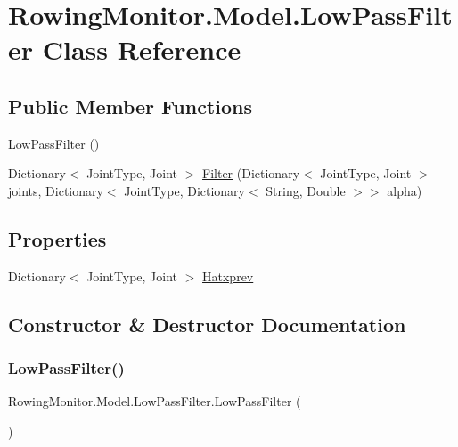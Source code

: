 \hypertarget{class_rowing_monitor_1_1_model_1_1_low_pass_filter}{}\section{Rowing\+Monitor.\+Model.\+Low\+Pass\+Filter Class Reference}
\label{class_rowing_monitor_1_1_model_1_1_low_pass_filter}
\subsection*{Public Member Functions}
\begin{DoxyCompactItemize}
\item 
\hyperlink{class_rowing_monitor_1_1_model_1_1_low_pass_filter_ae2409a1bea75885b3de02c300f46bb68}{Low\+Pass\+Filter} ()
\item 
Dictionary$<$ Joint\+Type, Joint $>$ \hyperlink{class_rowing_monitor_1_1_model_1_1_low_pass_filter_abd95054e31280d78ad6d0d4a5bd106ea}{Filter} (Dictionary$<$ Joint\+Type, Joint $>$ joints, Dictionary$<$ Joint\+Type, Dictionary$<$ String, Double $>$$>$ alpha)
\end{DoxyCompactItemize}
\subsection*{Properties}
\begin{DoxyCompactItemize}
\item 
Dictionary$<$ Joint\+Type, Joint $>$ \hyperlink{class_rowing_monitor_1_1_model_1_1_low_pass_filter_ab5c930d79699ed13c290b56a9d4501c6}{Hatxprev}
\end{DoxyCompactItemize}


\subsection{Constructor \& Destructor Documentation}
\mbox{\label{class_rowing_monitor_1_1_model_1_1_low_pass_filter_ae2409a1bea75885b3de02c300f46bb68}} 
\subsubsection{\texorpdfstring{Low\+Pass\+Filter()}{LowPassFilter()}}
{\footnotesize\ttfamily Rowing\+Monitor.\+Model.\+Low\+Pass\+Filter.\+Low\+Pass\+Filter (\begin{DoxyParamCaption}{ }\end{DoxyParamCaption})}



